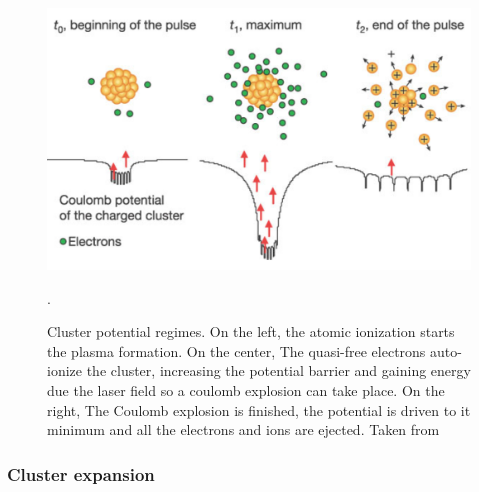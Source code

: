 \begin{figure}[hbtp] \label{img:clusterpotential}

\centering
\includegraphics[scale=0.35]{../Images/clusterpotential.PNG}
\caption[Cluster potential regimes]{Cluster potential regimes. On the left, the atomic ionization starts the plasma formation. On the center, The quasi-free electrons auto-ionize the cluster, increasing the potential barrier and  gaining energy due the laser field so a coulomb explosion can take place. On the right, The Coulomb explosion is finished, the potential is driven to it minimum and all the electrons and ions are ejected. Taken from \cite{wabnitz_multiple_2002}}.
\end{figure}

\subsubsection{Cluster expansion}


